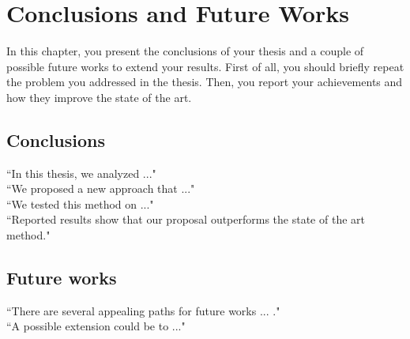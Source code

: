 \chapter{Conclusions and Future Works}
\label{ch:conclusions}

In this chapter, you present the conclusions of your thesis and a couple of possible future works to extend your results. First of all, you should briefly repeat the problem you addressed in the thesis. Then, you report your achievements and how they improve the state of the art.

\section{Conclusions}
``In this thesis, we analyzed ..."\\
``We proposed a new approach that ..."\\
``We tested this method on ..."\\
``Reported results show that our proposal outperforms the state of the art method."

\section{Future works}
``There are several appealing paths for future works ... ."\\
``A possible extension could be to ..."
